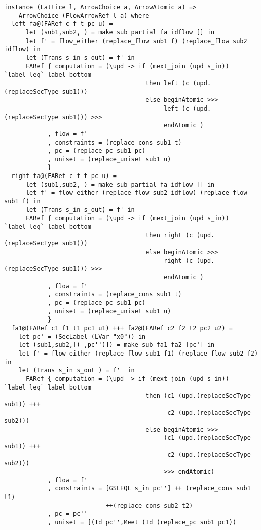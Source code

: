 \begin{Verbatim}[fontsize=\footnotesize,frame=lines,
                 framesep=5mm, label={[FlowArrowRef.hs]FlowArrowRef.hs}]
instance (Lattice l, ArrowChoice a, ArrowAtomic a) => 
    ArrowChoice (FlowArrowRef l a) where
  left fa@(FARef c f t pc u) = 
      let (sub1,sub2,_) = make_sub_partial fa idflow [] in
      let f' = flow_either (replace_flow sub1 f) (replace_flow sub2 idflow) in
      let (Trans s_in s_out) = f' in
      FARef { computation = (\upd -> if (mext_join (upd s_in)) `label_leq` label_bottom
                                       then left (c (upd.(replaceSecType sub1)))
                                       else beginAtomic >>> 
                                            left (c (upd.(replaceSecType sub1))) >>> 
                                            endAtomic )
            , flow = f'
            , constraints = (replace_cons sub1 t)
            , pc = (replace_pc sub1 pc)
            , uniset = (replace_uniset sub1 u)
            }
  right fa@(FARef c f t pc u) = 
      let (sub1,sub2,_) = make_sub_partial fa idflow [] in
      let f' = flow_either (replace_flow sub2 idflow) (replace_flow sub1 f) in
      let (Trans s_in s_out) = f' in
      FARef { computation = (\upd -> if (mext_join (upd s_in)) `label_leq` label_bottom
                                       then right (c (upd.(replaceSecType sub1)))
                                       else beginAtomic >>> 
                                            right (c (upd.(replaceSecType sub1))) >>> 
                                            endAtomic )
            , flow = f'
            , constraints = (replace_cons sub1 t)
            , pc = (replace_pc sub1 pc)
            , uniset = (replace_uniset sub1 u)
            }
  fa1@(FARef c1 f1 t1 pc1 u1) +++ fa2@(FARef c2 f2 t2 pc2 u2) =
    let pc' = (SecLabel (LVar "x0")) in
    let (sub1,sub2,[(_,pc'')]) = make_sub fa1 fa2 [pc'] in
    let f' = flow_either (replace_flow sub1 f1) (replace_flow sub2 f2) in
    let (Trans s_in s_out ) = f'  in
      FARef { computation = (\upd -> if (mext_join (upd s_in)) `label_leq` label_bottom
                                       then (c1 (upd.(replaceSecType sub1)) +++ 
                                             c2 (upd.(replaceSecType sub2)))
                                       else beginAtomic >>> 
                                            (c1 (upd.(replaceSecType sub1)) +++ 
                                             c2 (upd.(replaceSecType sub2))) 
                                            >>> endAtomic)
            , flow = f'
            , constraints = [GSLEQL s_in pc''] ++ (replace_cons sub1 t1)
                            ++(replace_cons sub2 t2)
            , pc = pc''
            , uniset = [(Id pc'',Meet (Id (replace_pc sub1 pc1)) 

\end{Verbatim}
